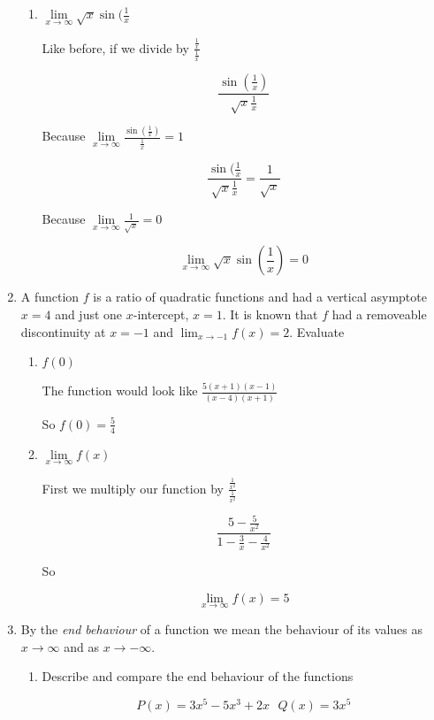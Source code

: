\documentclass{article}
\begin{document}
\begin{enumerate}
\begin{enumerate}
			\item $\lim \limits _{x \to \infty} \sqrt{x} \sin(\frac{1}{x}$

			Like before, if we divide by $\frac{ \frac{1}{x} }{ \frac{1}{x} }$

			$$\frac{\sin( \frac{1}{x} )}{\sqrt{x} \frac{1}{x}}$$

			Because $\lim \limits _{x \to \infty} \frac{ \sin(\frac{1}{x}) }{ \frac{1}{x} } = 1$

			$$\frac{ \sin( \frac{1}{x} }{\sqrt{x} \frac{1}{x}} = \frac{1}{\sqrt{x}}$$

			Because $\lim \limits _{x \to \infty} \frac{1}{\sqrt{x}} = 0$

			$$\lim \limits _{x \to \infty} \sqrt{x} \sin(\frac{1}{x}) = 0$$

		\end{enumerate}

		\item A function $f$ is a ratio of quadratic functions and had a vertical asymptote $x = 4$ and
			just one $x$-intercept, $x = 1$. It is known that $f$ had a removeable discontinuity at $x = -1$ and
			$\lim _{x \to -1} f(x) = 2$. Evaluate

		\begin{enumerate}
			\item $f(0)$

			The function would look like $\frac{5(x+1)(x-1)}{(x-4)(x+1)}$

			So $f(0) = \frac{5}{4}$

			\item $\lim \limits _{x \to \infty} f(x)$

			First we multiply our function by $\frac{ \frac{1}{x^2} }{ \frac{1}{x^2} }$

			$$\frac{ 5 - \frac{5}{x^2} }{1 - \frac{3}{x} - \frac{4}{x^2}}$$

			So

			$$\lim \limits _{x \to \infty} f(x) = 5$$
		\end{enumerate}

		\item By the \emph{end behaviour} of a function we mean the behaviour of its values as
			$x \to \infty$ and as $x \to -\infty$.

		\begin{enumerate}
			\item Describe and compare the end behaviour of the functions

			$$P(x) = 3x^5 - 5x^3 + 2x \text{	} Q(x) = 3x^5$$


\end{enumerate}
\end{enumerate}
\end{document}
